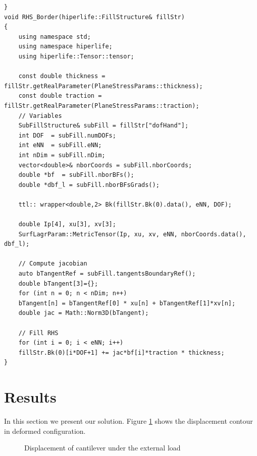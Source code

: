 \documentclass[]{article}
\begin{document}
\begin{lstlisting}
}
void RHS_Border(hiperlife::FillStructure& fillStr)
{
	using namespace std;
	using namespace hiperlife;
	using hiperlife::Tensor::tensor;
	
	const double thickness = fillStr.getRealParameter(PlaneStressParams::thickness);
	const double traction = fillStr.getRealParameter(PlaneStressParams::traction);
	// Variables
	SubFillStructure& subFill = fillStr["dofHand"];
	int DOF  = subFill.numDOFs;
	int eNN  = subFill.eNN;
	int nDim = subFill.nDim;
	vector<double>& nborCoords = subFill.nborCoords;
	double *bf  = subFill.nborBFs();
	double *dbf_l = subFill.nborBFsGrads();
	
	ttl:: wrapper<double,2> Bk(fillStr.Bk(0).data(), eNN, DOF);
	
	double Ip[4], xu[3], xv[3];
	SurfLagrParam::MetricTensor(Ip, xu, xv, eNN, nborCoords.data(), dbf_l);
	
	// Compute jacobian
	auto bTangentRef = subFill.tangentsBoundaryRef();
	double bTangent[3]={};
	for (int n = 0; n < nDim; n++)
	bTangent[n] = bTangentRef[0] * xu[n] + bTangentRef[1]*xv[n];
	double jac = Math::Norm3D(bTangent);
	
	// Fill RHS
	for (int i = 0; i < eNN; i++)
	fillStr.Bk(0)[i*DOF+1] += jac*bf[i]*traction * thickness;
}
\end{lstlisting}
\section{Results} \label{sec: rst}
In this section we present our solution. Figure \ref{fig_Rs1} shows the displacement contour in deformed configuration.
\begin{figure}[htbp]
	\centering
	\qquad
	\caption{Displacement of cantilever under the external load}%
	\label{fig_Rs1}%
\end{figure}



\end{document}
